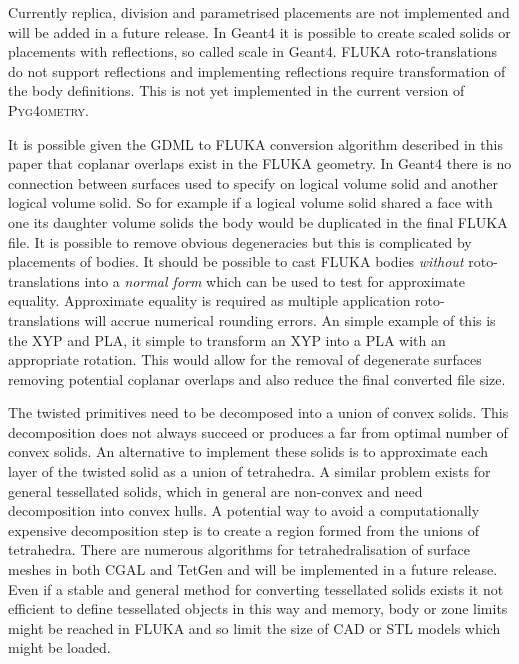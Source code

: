 \documentclass[final,5p,times,twocolumn]{elsarticle}
\newcommand{\PYGEOMETRY}{\textsc{Pyg4ometry}}
\begin{document}
Currently replica, division and parametrised placements are not implemented 
and will be added in a future release. In Geant4 it is possible to create scaled 
solids or placements with reflections, so called scale in Geant4. FLUKA 
roto-translations do not support reflections and implementing reflections 
require transformation of the body definitions. This is not yet implemented 
in the current version of \PYGEOMETRY{}. 

It is possible given the GDML to FLUKA conversion algorithm described 
in this paper that coplanar overlaps exist in the FLUKA geometry.  In 
Geant4 there is no connection between surfaces used to specify on 
logical volume solid and another logical volume solid. So for example 
if a logical volume solid shared a face with one its daughter volume 
solids the body would be duplicated in the final FLUKA file. It 
is possible to remove obvious degeneracies but this is complicated by 
placements of bodies. It should be possible to cast FLUKA bodies 
{\em without} roto-translations into a {\em normal form} which can be used 
to test for approximate equality. Approximate equality is required as 
multiple application roto-translations will accrue numerical rounding errors.
An simple example of this is the XYP and PLA, it simple to transform an 
XYP into a PLA with an appropriate rotation. This would allow for the removal 
of degenerate surfaces removing potential coplanar overlaps and also reduce 
the final converted file size.

The twisted primitives need to be decomposed 
into a union of convex solids. This decomposition does not always 
succeed or produces a far from optimal number of convex solids. 
An alternative to implement these solids is to approximate each 
layer of the twisted solid as a union of tetrahedra. A similar problem 
exists for general tessellated solids, which in general
are non-convex and need decomposition into convex hulls. A potential 
way to avoid a computationally expensive decomposition step is to 
create a region formed from the unions of tetrahedra. There are numerous 
algorithms for tetrahedralisation of surface meshes in both CGAL and TetGen 
and will be implemented in a future release. Even if a stable and general 
method for converting tessellated solids exists it not efficient to define 
tessellated objects in this way and memory, body or zone limits might
be reached in FLUKA and so limit the size of CAD or STL models which 
might be loaded.
\end{document}
